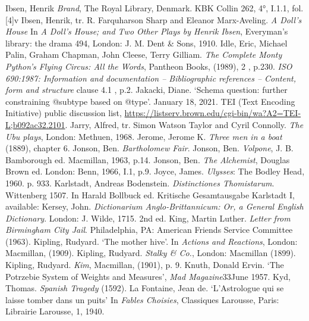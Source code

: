 \begin{bibitemlist}{1}
 Ibsen, Henrik \textit{Brand}, The Royal Library, Denmark. KBK Collin 262, 4°, I.1.1, fol. [4]v
 Ibsen, Henrik, tr. R. Farquharson Sharp and Eleanor Marx-Aveling. \textit{A Doll's House} In \textit{A Doll's House; and Two Other Plays by Henrik Ibsen}, Everyman's library: the drama 494, London: J. M. Dent \& Sons, 1910.
 Idle, Eric, Michael Palin, Graham Chapman, John Cleese, Terry Gilliam. \textit{The Complete Monty Python's Flying Circus: All the Words}, Pantheon Books, (1989), 2 , p.230.
 \textit{ISO 690:1987: Information and documentation – Bibliographic references – Content, form and structure} clause 4.1 , p.2.
 Jakacki, Diane. ‘Schema question: further constraining @subtype based on @type’. January 18, 2021. TEI (Text Encoding Initiative) public discussion list, \url{https://listserv.brown.edu/cgi-bin/wa?A2=TEI-L;b092ac32.2101}.
 Jarry, Alfred, tr. Simon Watson Taylor and Cyril Connolly. \textit{The Ubu plays}, London: Methuen, 1968.
 Jerome, Jerome K.  \textit{Three men in a boat} (1889), chapter 6.
 Jonson, Ben. \textit{Bartholomew Fair}.
 Jonson, Ben. \textit{Volpone}, J. B. Bamborough ed. Macmillan, 1963, p.14.
 Jonson, Ben. \textit{The Alchemist}, Douglas Brown ed. London: Benn, 1966, I.1, p.9.
 Joyce, James. \textit{Ulysses}: The Bodley Head, 1960. p. 933.
 Karlstadt, Andreas Bodenstein. \textit{Distinctiones Thomistarum}. Wittenberg 1507. In Harald Bollbuck ed. Kritische Gesamtausgabe Karlstadt I, available: 
 Kersey, John. \textit{Dictionarium Anglo-Brittannicum: Or, a General English Dictionary}. London: J. Wilde, 1715. 2nd ed.
 King, Martin Luther. \textit{Letter from Birmingham City Jail}. Philadelphia, PA: American Friends Service Committee (1963).
 Kipling, Rudyard. ‘The mother hive’. In \textit{Actions and Reactions}, London: Macmillan, (1909).
 Kipling, Rudyard. \textit{Stalky \& Co.}, London: Macmillan (1899).
 Kipling, Rudyard. \textit{Kim}, Macmillan, (1901), p. 9.
 Knuth, Donald Ervin. ‘The Potrzebie System of Weights and Measures’, \textit{Mad Magazine}33June 1957.
 Kyd, Thomas. \textit{Spanish Tragedy} (1592).
 La Fontaine, Jean de. ‘L'Astrologue qui se laisse tomber dans un puits’ In \textit{Fables Choisies}, Classiques Larousse, Paris: Librairie Larousse, 1, 1940.

\end{bibitemlist}

